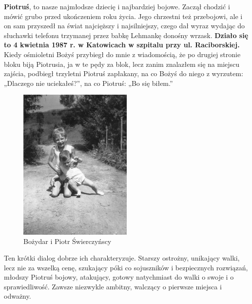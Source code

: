 \clearpage

\textbf{Piotruś}, to nasze najmłodsze dziecię i najbardziej bojowe. Zaczął chodzić i mówić grubo przed ukończeniem roku życia. Jego chrzestni też przebojowi, ale i on sam przyszedł na świat najcięższy i najsilniejszy, czego dał wyraz wydając do słuchawki telefonu trzymanej przez babkę Lehmankę donośny wrzask. \textbf{Działo się to 4 kwietnia 1987 r. w Katowicach w szpitalu przy ul. Raciborskiej.} Kiedy ośmioletni Bożyś przybiegł do mnie z wiadomością, że po drugiej stronie bloku biją Piotrusia, ja w te pędy za blok, lecz zanim znalazłem się na miejscu zajścia, podbiegł trzyletni Piotruś zapłakany, na co Bożyś do niego z wyrzutem: „Dlaczego nie uciekałeś?”, na co Piotruś: „Bo się biłem.” 
\begin{figure}[!h]
\begin{center}
\includegraphics[width=0.5\textwidth]{photo/bozydar_piotr_swierczynscy_1.jpg}
\caption{Bożydar i Piotr Świerczyńscy}
\end{center}
\end{figure}

Ten krótki dialog dobrze ich charakteryzuje. Starszy ostrożny, unikający walki, lecz nie za wszelką cenę, szukający póki co sojuszników i bezpiecznych rozwiązań, młodszy Piotruś bojowy, atakujący, gotowy natychmiast do walki o swoje i o sprawiedliwość. Zawsze niezwykle ambitny, walczący o pierwsze miejsca i odważny. 

